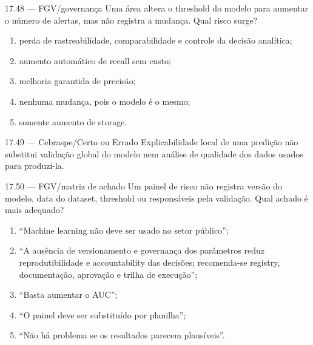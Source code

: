 \begin{questao}{ 17.48 — FGV/governança}
Uma área altera o threshold do modelo para aumentar o número de alertas, mas não registra a mudança. Qual risco surge?
\begin{enumerate}[label=\Alph*)]
\item perda de rastreabilidade, comparabilidade e controle da decisão analítica;
\item aumento automático de recall sem custo;
\item melhoria garantida de precisão;
\item nenhuma mudança, pois o modelo é o mesmo;
\item somente aumento de storage.
\end{enumerate}
\end{questao}

\begin{questao}{ 17.49 — Cebraspe/Certo ou Errado}
Explicabilidade local de uma predição não substitui validação global do modelo nem análise de qualidade dos dados usados para produzi-la.
\end{questao}

\begin{questao}{ 17.50 — FGV/matriz de achado}
Um painel de risco não registra versão do modelo, data do dataset, threshold ou responsáveis pela validação. Qual achado é mais adequado?
\begin{enumerate}[label=\Alph*)]
\item ``Machine learning não deve ser usado no setor público'';
\item ``A ausência de versionamento e governança dos parâmetros reduz reprodutibilidade e accountability das decisões; recomenda-se registry, documentação, aprovação e trilha de execução'';
\item ``Basta aumentar o AUC'';
\item ``O painel deve ser substituído por planilha'';
\item ``Não há problema se os resultados parecem plausíveis''.
\end{enumerate}
\end{questao}
